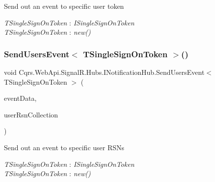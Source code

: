 Send out an event to specific user token 

\begin{Desc}
\item[Type Constraints]\begin{description}
\item[{\em T\+Single\+Sign\+On\+Token} : {\em I\+Single\+Sign\+On\+Token}]\item[{\em T\+Single\+Sign\+On\+Token} : {\em new()}]\end{description}
\end{Desc}
\mbox{\label{interfaceCqrs_1_1WebApi_1_1SignalR_1_1Hubs_1_1INotificationHub_a85206bb4c54103e9a377d34baee285a4}} 
\subsubsection{\texorpdfstring{Send\+Users\+Event$<$ T\+Single\+Sign\+On\+Token $>$()}{SendUsersEvent< TSingleSignOnToken >()}}
{\footnotesize\ttfamily void Cqrs.\+Web\+Api.\+Signal\+R.\+Hubs.\+I\+Notification\+Hub.\+Send\+Users\+Event$<$ T\+Single\+Sign\+On\+Token $>$ (\begin{DoxyParamCaption}\item[{\hyperlink{interfaceCqrs_1_1Events_1_1IEvent}{I\+Event}$<$ T\+Single\+Sign\+On\+Token $>$}]{event\+Data,  }\item[{params Guid \mbox{[}$\,$\mbox{]}}]{user\+Rsn\+Collection }\end{DoxyParamCaption})}



Send out an event to specific user R\+S\+Ns 

\begin{Desc}
\item[Type Constraints]\begin{description}
\item[{\em T\+Single\+Sign\+On\+Token} : {\em I\+Single\+Sign\+On\+Token}]\item[{\em T\+Single\+Sign\+On\+Token} : {\em new()}]\end{description}
\end{Desc}
